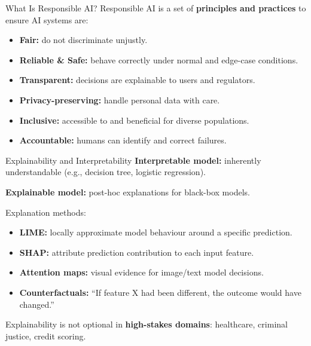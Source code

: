 \documentclass[10pt]{beamer}
\begin{document}
\begin{frame}{What Is Responsible AI?}
    Responsible AI is a set of \textbf{principles and practices} to ensure AI systems are:

    \vspace{0.15cm}
    \begin{itemize}
        \item \textbf{Fair:} do not discriminate unjustly.
        \item \textbf{Reliable \& Safe:} behave correctly under normal and edge-case conditions.
        \item \textbf{Transparent:} decisions are explainable to users and regulators.
        \item \textbf{Privacy-preserving:} handle personal data with care.
        \item \textbf{Inclusive:} accessible to and beneficial for diverse populations.
        \item \textbf{Accountable:} humans can identify and correct failures.
    \end{itemize}
\end{frame}

\begin{frame}{Explainability and Interpretability}
    \textbf{Interpretable model:} inherently understandable (e.g., decision tree, logistic regression).

    \textbf{Explainable model:} post-hoc explanations for black-box models.

    \vspace{0.2cm}
    Explanation methods:
    \begin{itemize}
        \item \textbf{LIME:} locally approximate model behaviour around a specific prediction.
        \item \textbf{SHAP:} attribute prediction contribution to each input feature.
        \item \textbf{Attention maps:} visual evidence for image/text model decisions.
        \item \textbf{Counterfactuals:} ``If feature X had been different, the outcome would have changed.''
    \end{itemize}

    \vspace{0.2cm}
    Explainability is not optional in \textbf{high-stakes domains}: healthcare, criminal justice, credit scoring.
\end{frame}
\end{document}
